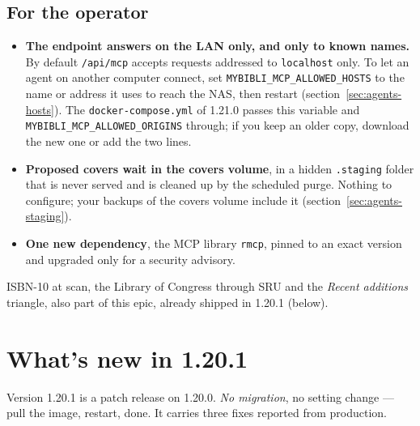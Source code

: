 \subsection*{For the operator}

\begin{itemize}
  \item \textbf{The endpoint answers on the LAN only, and only to
        known names.} By default \texttt{/api/mcp} accepts requests
        addressed to \texttt{localhost} only. To let an agent on
        another computer connect, set
        \texttt{MYBIBLI\_MCP\_ALLOWED\_HOSTS} to the name or address it
        uses to reach the NAS, then restart
        (section~\ref{sec:agents-hosts}). The \texttt{docker-compose.yml}
        of 1.21.0 passes this variable and
        \texttt{MYBIBLI\_MCP\_ALLOWED\_ORIGINS} through; if you keep an
        older copy, download the new one or add the two lines.
  \item \textbf{Proposed covers wait in the covers volume}, in a hidden
        \texttt{.staging} folder that is never served and is cleaned up
        by the scheduled purge. Nothing to configure; your backups of
        the covers volume include it (section~\ref{sec:agents-staging}).
  \item \textbf{One new dependency}, the MCP library \texttt{rmcp},
        pinned to an exact version and upgraded only for a security
        advisory.
\end{itemize}

ISBN-10 at scan, the Library of Congress through SRU and the
\emph{Recent additions} triangle, also part of this epic, already
shipped in 1.20.1 (below).

\section{What's new in 1.20.1}\label{sec:whats-new-1.20.1}

Version 1.20.1 is a patch release on 1.20.0. \emph{No migration}, no
setting change --- pull the image, restart, done. It carries three
fixes reported from production.

